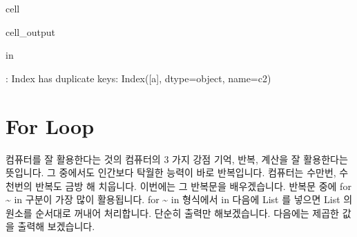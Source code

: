 \documentclass[letterpaper,10pt,english]{jupyterBook}
\begin{document}
\begin{sphinxuseclass}{cell}
\begin{sphinxVerbatimOutput}
\begin{sphinxuseclass}{cell_output}
\begin{sphinxVerbatim}[commandchars=\\\{\}]
 in 
             
               \PYG{p}{[}\PYG{p}{]}
              
         

: Index has duplicate keys: Index([\PYGZsq{}a\PYGZsq{}], dtype=\PYGZsq{}object\PYGZsq{}, name=\PYGZsq{}c2\PYGZsq{})
\end{sphinxVerbatim}

\end{sphinxuseclass}\end{sphinxVerbatimOutput}

\end{sphinxuseclass}

\section{For Loop}
\label{\detokenize{chapter2/2.1.3_Python_Basics:for-loop}}\label{\detokenize{chapter2/2.1.3_Python_Basics::doc}}
\sphinxAtStartPar
컴퓨터를 잘 활용한다는 것의 컴퓨터의 3 가지 강점 \sphinxhyphen{} 기억, 반복, 계산을 잘 활용한다는 뜻입니다. 그 중에서도 인간보다 탁월한 능력이 바로 반복입니다. 컴퓨터는 수만번, 수천번의 반복도 금방 해 치웁니다. 이번에는 그 반복문을 배우겠습니다. 반복문 중에 for \textasciitilde{} in 구분이 가장 많이 활용됩니다. for \textasciitilde{} in 형식에서 in 다음에 List 를 넣으면 List 의 원소를 순서대로 꺼내어 처리합니다. 단순히 출력만 해보겠습니다. 다음에는 제곱한 값을 출력해 보겠습니다.
\end{document}
